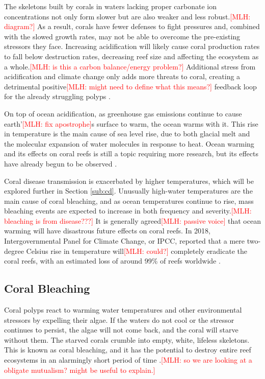 \documentclass{book}\usepackage{knitr}
\newcommand{\red}[1]{\textcolor{red}{[MLH: #1]}}
\begin{document}
\begin{knitrout}
\begin{kframe}
{The skeletons built by corals in waters lacking proper carbonate ion concentrations not only form slower but are also weaker and less robust.\red{diagram?} As a result, corals have fewer defenses to fight pressures and, combined with the slowed growth rates, may not be able to overcome the pre-existing stressors they face. Increasing acidification will likely cause coral production rates to fall below destruction rates, decreasing reef size and affecting the ecosystem as a whole.\red{is this a carbon balance/energy problem?} Additional stress from acidification and climate change only adds more threats to coral, creating a detrimental positive\red{might need to define what this means?} feedback loop for the already struggling polyps \citep{Ayala_2009}.

On top of ocean acidification, as greenhouse gas emissions continue to cause earth’\red{fix apostrophe}s surface to warm, the ocean warms with it. This rise in temperature is the main cause of sea level rise, due to both glacial melt and the molecular expansion of water molecules in response to heat. Ocean warming and its effects on coral reefs is still a topic requiring more research, but its effects have already begun to be observed \citep{wwfindex}.

Coral disease transmission is exacerbated by higher temperatures, which will be explored further in Section \ref{sub:cd}. Unusually high-water temperatures are the main cause of coral bleaching, and as ocean temperatures continue to rise, mass bleaching events are expected to increase in both frequency and severity\citep{Keller2009ClimateCC}.\red{bleaching is from disease???} It is generally agreed\red{passive voice} that ocean warming will have disastrous future effects on coral reefs.  In 2018, Intergovernmental Panel for Climate Change, or IPCC, reported that a mere two-degree Celsius rise in temperature will\red{could?} completely eradicate the coral reefs, with an estimated loss of around 99\% of reefs worldwide \citep{wwfindex}. 

\subsection{Coral Bleaching}

Coral polyps react to warming water temperatures and other environmental stressors by expelling their algae. If the waters do not cool or the stressor continues to persist, the algae will not come back, and the coral will starve without them. The starved corals crumble into empty, white, lifeless skeletons. This is known as coral bleaching, and it has the potential to destroy entire reef ecosystems in an alarmingly short period of time \citep{https://doi.org/10.1111/gcb.14871}.\red{so we are looking at a obligate mutualism?  might be useful to explain.} 

}
\end{kframe}
\end{knitrout}
\end{document}
